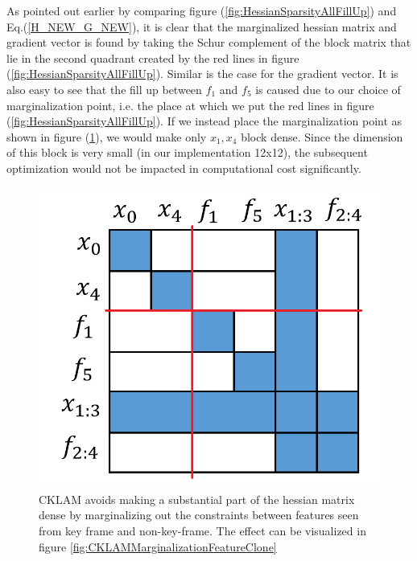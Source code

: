 As pointed out earlier by comparing figure (\ref{fig:HessianSparsityAllFillUp}) and Eq.(\ref{H_NEW_G_NEW}), it is clear that the marginalized hessian matrix and gradient vector is found by taking the Schur complement of the block matrix that lie in the second quadrant created by the red lines in figure (\ref{fig:HessianSparsityAllFillUp}). Similar is the case for the gradient vector. It is also easy to see that the fill up between $f_1$ and $f_5$ is caused due to our choice of marginalization point, i.e. the place at which we put the red lines in figure (\ref{fig:HessianSparsityAllFillUp}). If we instead place the marginalization point as shown in figure (\ref{fig:HessianSparsityAllFillUpKeepSparsity}), we would make only $x_1, x_4$ block dense. Since the dimension of this block is very small (in our implementation 12x12), the subsequent optimization would not be impacted in computational cost significantly.

\begin{figure}[ht]
	\centering
		\includegraphics[width=1.00\textwidth]{images/HessianSparsityAllFillUpKeepSparsity.png}
  \caption{CKLAM avoids making a substantial part of the hessian matrix dense by marginalizing out the constraints between features seen from key frame and non-key-frame. The effect can be visualized in figure \ref{fig:CKLAMMarginalizationFeatureClone}}
  \label{fig:HessianSparsityAllFillUpKeepSparsity}
\end{figure}

